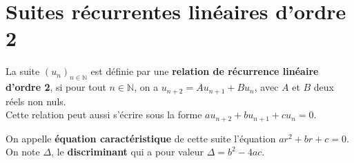 \documentclass[french]{book}
\newcommand{\N}{\mathbb {N}}
\newcommand{\suite}[1][u]{\left( #1_{n} \right)_{n\in\N}}
\newcommand{\un}{\suite}
\begin{document}
% 
% 


\section{Suites récurrentes linéaires d'ordre 2}
\begin{defn}
La suite $\un$ est définie par une \textbf{relation de récurrence linéaire d'ordre 2}, si pour tout $n\in\N$, on a $u_{n+2} = Au_{n+1} + Bu_n$, avec $A$ et $B$ deux réels non nuls.\\
Cette relation peut aussi s'écrire sous la forme $au_{n+2}+bu_{n+1}+cu_n=0$.
\end{defn}

\begin{defn}
On appelle \textbf{équation caractéristique} de cette suite l'équation $ar^2+br+c=0$.\\
On note $\Delta$, le \textbf{discriminant} qui a pour valeur $\Delta=b^2-4ac$.
\end{defn}
\end{document}

